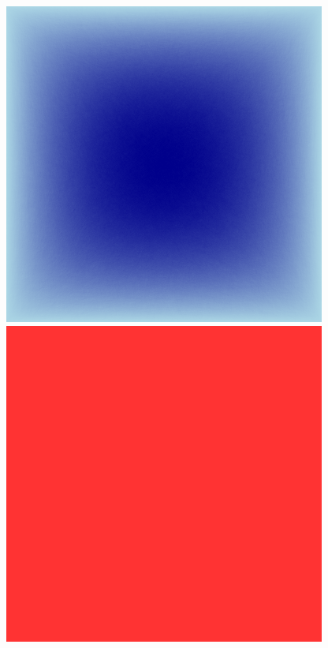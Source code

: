 \documentclass[12pt, a4paper]{article}
\begin{document}
\begin{multicols}{2}
{\centering
\includegraphics[width=\columnwidth]{src/youtube/datashader/simple/fullgraph_edges}\\
\label{fig:ds_fullgraph_edges}}
{\centering
\includegraphics[width=\columnwidth]{src/youtube/datashader/simple/fullgraph_full}\\
\label{fig:ds_fullgraph_full}}
\end{multicols}
\end{document}
